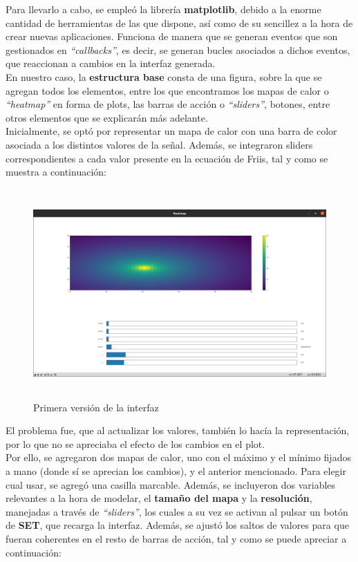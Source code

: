 Para llevarlo a cabo, se empleó la librería \textbf{matplotlib}, debido a la enorme cantidad de herramientas de las que dispone, así como de su sencillez a la hora de crear nuevas aplicaciones. Funciona de manera que se generan eventos que son gestionados en \emph{``callbacks''}, es decir, se generan bucles asociados a dichos eventos, que reaccionan a cambios en la interfaz generada.\\

En nuestro caso, la \textbf{estructura base} consta de una figura, sobre la que se agregan todos los elementos, entre los que encontramos los mapas de calor o \emph{``heatmap''} en forma de plots, las barras de acción o \emph{``sliders''}, botones, entre otros elementos que se explicarán más adelante.\\

Inicialmente, se optó por representar un mapa de calor con una barra de color asociada a los distintos valores de la señal. Además, se integraron sliders correspondientes a cada valor presente en la ecuación de Friis, tal y como se muestra a continuación:\\

\begin{figure} [H]
	\begin{center}
	\includegraphics[height=8cm]{imagenes/cap4/6_Friss_firstGUI.png}
	\end{center}
	\caption[Primera versión de la interfaz]{Primera versión de la interfaz}
	\label{fig:friis_init_app}
\end{figure}
\newpage
El problema fue, que al actualizar los valores, también lo hacía la representación, por lo que no se apreciaba el efecto de los cambios en el plot.\\

Por ello, se agregaron dos mapas de calor, uno con el máximo y el mínimo fijados a mano (donde sí se aprecian los cambios), y el anterior mencionado. Para elegir cual usar, se agregó una casilla marcable. Además, se incluyeron dos variables relevantes a la hora de modelar, el \textbf{tamaño del mapa} y la \textbf{resolución}, manejadas a través de \emph{``sliders''}, los cuales a su vez se activan al pulsar un botón de \textbf{SET}, que recarga la interfaz. Además, se ajustó los saltos de valores para que fueran coherentes en el resto de barras de acción, tal y como se puede apreciar a continuación:\\

